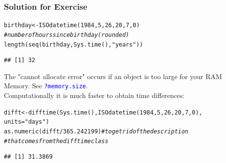 \documentclass[xcolor=table, xcolor=dvipsnames]{beamer}\usepackage[]{graphicx}\usepackage[]{color}
\makeatletter
\newcommand{\hlnum}[1]{\textcolor[rgb]{0,0,0}{#1}}
\newcommand{\hlstr}[1]{\textcolor[rgb]{0.545,0.137,0.137}{#1}}
\newcommand{\hlcom}[1]{\textcolor[rgb]{0,0.392,0}{\textit{#1}}}
\newcommand{\hlopt}[1]{\textcolor[rgb]{0,0,0}{#1}}
\newcommand{\hlstd}[1]{\textcolor[rgb]{0,0,0}{#1}}
\newcommand{\hlkwb}[1]{\textcolor[rgb]{0,0,0}{#1}}
\newcommand{\hlkwc}[1]{\textcolor[rgb]{1,0,1}{#1}}
\newcommand{\hlkwd}[1]{\textcolor[rgb]{0,0,1}{#1}}
\newenvironment{kframe}{%
 \def\at@end@of@kframe{}%
 \ifinner\ifhmode%
  \def\at@end@of@kframe{\end{minipage}}%
  \begin{minipage}{\columnwidth}%
 \fi\fi%
 \def\FrameCommand##1{\hskip\@totalleftmargin \hskip-\fboxsep
 \colorbox{shadecolor}{##1}\hskip-\fboxsep
     \hskip-\linewidth \hskip-\@totalleftmargin \hskip\columnwidth}%
 \MakeFramed {\advance\hsize-\width
   \@totalleftmargin\z@ \linewidth\hsize
   \@setminipage}}%
 {\par\unskip\endMakeFramed%
 \at@end@of@kframe}
\newenvironment{knitrout}{}{} %
\newcounter{exercisecount}
\newcommand{\rcode}[1]{\texttt{\textcolor{Blue}{#1}}} %
\makeatother
\begin{document}
\begin{frame}[fragile]\frametitle{Solution for Exercise }
\begin{knitrout}
\color{fgcolor}\begin{kframe}
\begin{alltt}
\hlstd{birthday} \hlkwb{<-} \hlkwd{ISOdatetime}\hlstd{(}\hlnum{1984}\hlstd{,}\hlnum{5}\hlstd{,}\hlnum{26}\hlstd{,}\hlnum{20}\hlstd{,}\hlnum{7}\hlstd{,}\hlnum{0}\hlstd{)}
\hlcom{# number of hours since birthday (rounded)}
\hlkwd{length}\hlstd{(}\hlkwd{seq}\hlstd{(birthday,} \hlkwd{Sys.time}\hlstd{(),} \hlstr{"years"}\hlstd{))}
\end{alltt}
\begin{verbatim}
## [1] 32
\end{verbatim}
\end{kframe}
\end{knitrout}
The "cannot allocate error" occurs if an object is too large for your RAM Memory. See \rcode{?memory.size}.\\ 
Computationally it is much faster to obtain time differences:
\begin{knitrout}\small
{}\color{fgcolor}\begin{kframe}
\begin{alltt}
\hlstd{difft} \hlkwb{<-} \hlkwd{difftime}\hlstd{(} \hlkwd{Sys.time}\hlstd{(),} \hlkwd{ISOdatetime}\hlstd{(}\hlnum{1984}\hlstd{,}\hlnum{5}\hlstd{,}\hlnum{26}\hlstd{,} \hlnum{20}\hlstd{,}\hlnum{7}\hlstd{,}\hlnum{0}\hlstd{),}
                   \hlkwc{units}\hlstd{=}\hlstr{"days"}\hlstd{)}
\hlkwd{as.numeric}\hlstd{(difft}\hlopt{/}\hlnum{365.242199}\hlstd{)} \hlcom{# to get rid of the description}
\hlcom{# that comes from the difftime class}
\end{alltt}
\begin{verbatim}
## [1] 31.3869
\end{verbatim}
\end{kframe}
\end{knitrout}
\end{frame}

\end{document}
